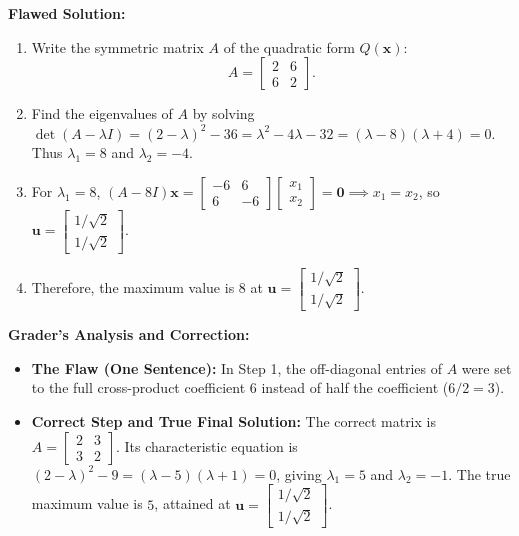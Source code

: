 \documentclass[11pt, letterpaper]{article}
\theoremstyle{definition}
\theoremstyle{remark}
\begin{document}
\textbf{Flawed Solution:}
\begin{enumerate}[label=\arabic*.]
    \item Write the symmetric matrix $A$ of the quadratic form $Q(\mathbf{x})$:
    \[
    A = \begin{bmatrix} 2 & 6 \\ 6 & 2 \end{bmatrix}.
    \]
    \item Find the eigenvalues of $A$ by solving $\det(A - \lambda I) = (2-\lambda)^2 - 36 = \lambda^2 - 4\lambda - 32 = (\lambda - 8)(\lambda + 4) = 0$. Thus $\lambda_1 = 8$ and $\lambda_2 = -4$.
    \item For $\lambda_1 = 8$, $(A - 8I)\mathbf{x} = \begin{bmatrix} -6 & 6 \\ 6 & -6 \end{bmatrix}\begin{bmatrix} x_1 \\ x_2 \end{bmatrix} = \mathbf{0} \implies x_1 = x_2$, so $\mathbf{u} = \begin{bmatrix} 1/\sqrt{2} \\ 1/\sqrt{2} \end{bmatrix}$.
    \item Therefore, the maximum value is $8$ at $\mathbf{u} = \begin{bmatrix} 1/\sqrt{2} \\ 1/\sqrt{2} \end{bmatrix}$.
\end{enumerate}

\textbf{Grader's Analysis and Correction:}
\begin{itemize}
    \item \textbf{The Flaw (One Sentence):} In Step 1, the off-diagonal entries of $A$ were set to the full cross-product coefficient $6$ instead of half the coefficient ($6/2 = 3$).
    \item \textbf{Correct Step and True Final Solution:} The correct matrix is $A = \begin{bmatrix} 2 & 3 \\ 3 & 2 \end{bmatrix}$. Its characteristic equation is $(2-\lambda)^2 - 9 = (\lambda - 5)(\lambda + 1) = 0$, giving $\lambda_1 = 5$ and $\lambda_2 = -1$. The true maximum value is $5$, attained at $\mathbf{u} = \begin{bmatrix} 1/\sqrt{2} \\ 1/\sqrt{2} \end{bmatrix}$.
\end{itemize}
\end{document}
